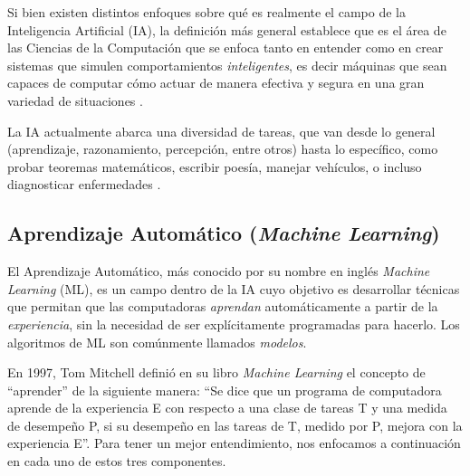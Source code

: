 \documentclass[../../main.tex]{subfiles}
\begin{document}
Si bien existen distintos enfoques sobre qué es realmente el campo de la Inteligencia Artificial (IA), la definición más general establece que es el área de las Ciencias de la Computación que se enfoca tanto en entender como en crear sistemas que simulen comportamientos \textit{inteligentes}, es decir máquinas que sean capaces de computar cómo actuar de manera efectiva y segura en una gran variedad de situaciones \cite{ai-a-modern-approach}. 

La IA actualmente abarca una diversidad de tareas, que van desde lo general (aprendizaje, razonamiento, percepción, entre otros) hasta lo específico, como probar teoremas matemáticos, escribir poesía, manejar vehículos, o incluso diagnosticar enfermedades \cite{ai-a-modern-approach}.


\subsection{Aprendizaje Automático (\textit{Machine Learning})}
El Aprendizaje Automático, más conocido por su nombre en inglés \textit{Machine Learning} (ML), es un campo dentro de la IA cuyo objetivo es desarrollar técnicas que permitan que las computadoras \textit{aprendan} automáticamente a partir de la \textit{experiencia}, sin la necesidad de ser explícitamente programadas para hacerlo. Los algoritmos de ML son comúnmente llamados \textit{modelos}.

En 1997, Tom Mitchell definió en su libro \textit{Machine Learning} \cite{ml-tom-mitchell} el concepto de ``aprender'' de la siguiente manera: ``Se dice que un programa de computadora aprende de la experiencia E con respecto a una clase de tareas T y una medida de desempeño P, si su desempeño en las tareas de T, medido por P, mejora con la experiencia E''. Para tener un mejor entendimiento, nos enfocamos a continuación en cada uno de estos tres componentes.
\end{document}
